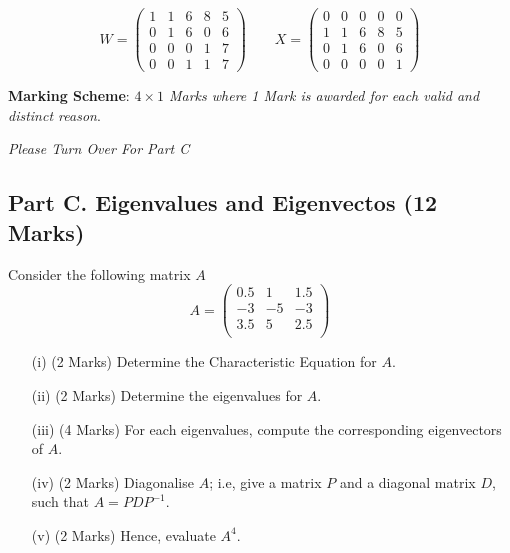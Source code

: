 \documentclass[a4paper,12pt]{article}
\begin{document}
\[
W = \begin{pmatrix}
1&1 & 6  &8 & 5
\\  0&1&6 &0 & 6
\\  0&0&0 &1 & 7
\\  0&0&1 &1 & 7
\end{pmatrix} \qquad X = \begin{pmatrix}
0&0&0 &0 & 0\\
1&1 & 6  &8 & 5
\\  0&1&6 &0 & 6
\\  0&0&0 &0 & 1

\end{pmatrix}
\]

\smallskip
\noindent \textbf{Marking Scheme}: \textit{$4 \times 1$ Marks where 1 Mark is awarded for each valid and distinct reason}.\\
\medskip

\noindent 	\textit{Please Turn Over For Part C }



	\subsection*{Part C. Eigenvalues and Eigenvectos (12 Marks)}
Consider the following matrix $A$ 
\[
A = \left(\begin{array}{rrr} 
0.5 & 1 & 1.5 \\
-3  & -5 & -3\\
3.5 & 5  & 2.5 \\ \end{array}\right)
\]	
	\begin{itemize}
		\item[(i)] (2 Marks) Determine the Characteristic Equation for $A$.
		\item[(ii)] (2 Marks) Determine the eigenvalues for $A$.
		\item[(iii)] (4 Marks) For each eigenvalues, compute the corresponding eigenvectors of $A$.
		
		\medskip\item[(iv)] (2 Marks) Diagonalise $A$; i.e, give a matrix $P$ and a diagonal matrix $D$, such that $A=PDP^{-1}$.
		
		\medskip \item[(v)] (2 Marks) Hence, evaluate $A^4$.
	\end{itemize} \vspace{0.4cm}
	
	
	
	
\end{document}
